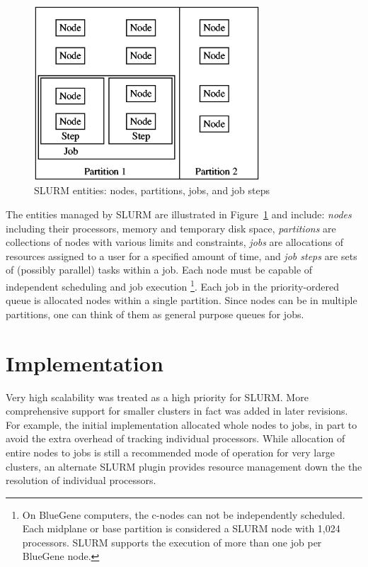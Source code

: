 \documentclass{../common/acm}
\begin{document}
\begin{figure}[tcb]
\centerline{\includegraphics[width=3.32in]{../figures/entities2.eps}}
\caption{\small SLURM entities: nodes, partitions, jobs, and job steps}
\label{entities}
\end{figure}

The entities managed by SLURM are illustrated in Figure~\ref{entities} 
and include:
{\em nodes} including their processors, memory and temporary disk space,
{\em partitions} are collections of nodes with various limits and constraints,
{\em jobs} are allocations of resources assigned
to a user for a specified amount of time, and
{\em job steps} are sets of (possibly parallel) tasks within a job.
Each node must be capable of independent scheduling and job execution
\footnote{On BlueGene computers, the c-nodes can not be independently 
scheduled. Each midplane or base partition is considered a SLURM node 
with 1,024 processors. SLURM supports the execution of more than one 
job per BlueGene node.}.
Each job in the priority-ordered queue is allocated nodes within a single 
partition.
Since nodes can be in multiple partitions, one can think of them as 
general purpose queues for jobs. 

\section{Implementation}

Very high scalability was treated as a high priority for SLURM. 
More comprehensive support for smaller clusters in fact was 
added in later revisions.
For example, the initial implementation allocated whole nodes 
to jobs, in part to avoid the extra overhead of tracking individual
processors.
While allocation of entire nodes to jobs is still a recommended mode of 
operation for very large clusters, an alternate SLURM plugin provides 
resource management down the the resolution of individual processors.
\end{document}
